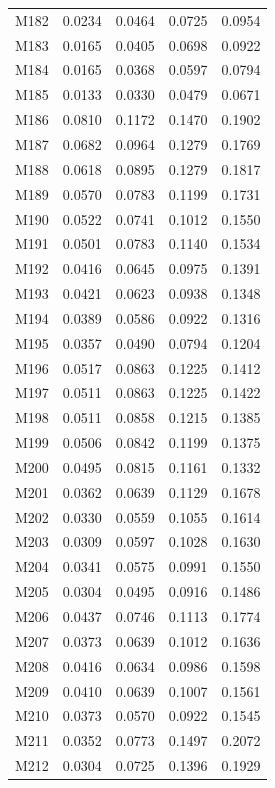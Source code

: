 \begin{longtable}{lrrrr}
M182 & 0.0234 & 0.0464 & 0.0725 & 0.0954 \\
M183 & 0.0165 & 0.0405 & 0.0698 & 0.0922 \\
M184 & 0.0165 & 0.0368 & 0.0597 & 0.0794 \\
M185 & 0.0133 & 0.0330 & 0.0479 & 0.0671 \\
M186 & 0.0810 & 0.1172 & 0.1470 & 0.1902 \\
M187 & 0.0682 & 0.0964 & 0.1279 & 0.1769 \\
M188 & 0.0618 & 0.0895 & 0.1279 & 0.1817 \\
M189 & 0.0570 & 0.0783 & 0.1199 & 0.1731 \\
M190 & 0.0522 & 0.0741 & 0.1012 & 0.1550 \\
M191 & 0.0501 & 0.0783 & 0.1140 & 0.1534 \\
M192 & 0.0416 & 0.0645 & 0.0975 & 0.1391 \\
M193 & 0.0421 & 0.0623 & 0.0938 & 0.1348 \\
M194 & 0.0389 & 0.0586 & 0.0922 & 0.1316 \\
M195 & 0.0357 & 0.0490 & 0.0794 & 0.1204 \\
M196 & 0.0517 & 0.0863 & 0.1225 & 0.1412 \\
M197 & 0.0511 & 0.0863 & 0.1225 & 0.1422 \\
M198 & 0.0511 & 0.0858 & 0.1215 & 0.1385 \\
M199 & 0.0506 & 0.0842 & 0.1199 & 0.1375 \\
M200 & 0.0495 & 0.0815 & 0.1161 & 0.1332 \\
M201 & 0.0362 & 0.0639 & 0.1129 & 0.1678 \\
M202 & 0.0330 & 0.0559 & 0.1055 & 0.1614 \\
M203 & 0.0309 & 0.0597 & 0.1028 & 0.1630 \\
M204 & 0.0341 & 0.0575 & 0.0991 & 0.1550 \\
M205 & 0.0304 & 0.0495 & 0.0916 & 0.1486 \\
M206 & 0.0437 & 0.0746 & 0.1113 & 0.1774 \\
M207 & 0.0373 & 0.0639 & 0.1012 & 0.1636 \\
M208 & 0.0416 & 0.0634 & 0.0986 & 0.1598 \\
M209 & 0.0410 & 0.0639 & 0.1007 & 0.1561 \\
M210 & 0.0373 & 0.0570 & 0.0922 & 0.1545 \\
M211 & 0.0352 & 0.0773 & 0.1497 & 0.2072 \\
M212 & 0.0304 & 0.0725 & 0.1396 & 0.1929 \\

\end{longtable}
